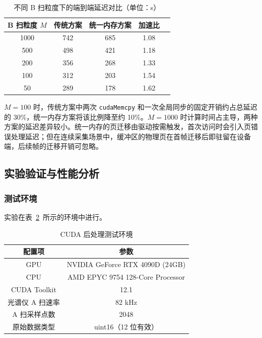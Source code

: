 \begin{table}[htbp]
\centering
\caption{不同 B 扫粒度下的端到端延迟对比（单位：\textmu s）}
\label{tab:unified_mem}
\begin{tabular}{ccccc}
\toprule
B 扫粒度 $M$ & 传统方案 & 统一内存方案 & 加速比 \\
\midrule
1000 & 742 & 685 & 1.08 \\
500 & 498 & 421 & 1.18 \\
200 & 356 & 268 & 1.33 \\
100 & 312 & 203 & 1.54 \\
50 & 289 & 178 & 1.62 \\
\bottomrule
\end{tabular}
\end{table}

$M = 100$ 时，传统方案中两次 \texttt{cudaMemcpy} 和一次全局同步的固定开销约占总延迟的 30\%，统一内存方案将该比例降至约 10\%。$M = 1000$ 时计算时间占主导，两种方案的延迟差异较小。统一内存的页迁移由驱动按需触发，首次访问时会引入页错误处理延迟；但在连续采集场景中，缓冲区的物理页在首帧迁移后即驻留在设备端，后续帧的迁移开销可忽略。

\subsection{实验验证与性能分析}\label{sec:cuda_exp}

\subsubsection{测试环境}

实验在表~\ref{tab:cuda_env}~所示的环境中进行。

\begin{table}[htbp]
\centering
\caption{CUDA 后处理测试环境}
\label{tab:cuda_env}
\begin{tabular}{cc}
\toprule
配置项 & 参数 \\
\midrule
GPU & NVIDIA GeForce RTX 4090D (24GB) \\
CPU & AMD EPYC 9754 128-Core Processor \\
CUDA Toolkit & 12.1 \\
光谱仪 A 扫速率 & 82 kHz \\
A 扫采样点数 & 2048 \\
原始数据类型 & uint16（12 位有效） \\
\bottomrule
\end{tabular}
\end{table}

